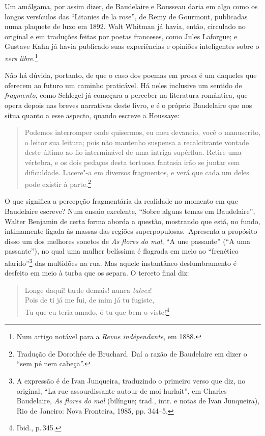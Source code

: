 Um amálgama, por assim dizer, de Baudelaire e Rousseau daria em algo
como os longos versículos das ``Litanies de la rose'', de Remy de
Gourmont, publicadas numa plaquete de luxo em 1892.
Walt Whitman já havia, então, circulado no original e em traduções
feitas por poetas franceses, como Jules Laforgue; e Gustave Kahn já
havia publicado suas experiências e opiniões inteligentes sobre o
\textit{vers libre}.\footnote{ Num artigo notável para a \textit{Revue
indépendante}, em 1888.}

Não há dúvida, portanto, de que o caso dos poemas em prosa é um
daqueles que oferecem ao futuro um caminho praticável. Há
neles inclusive um sentido de \textit{fragmento}, como Schlegel já
começara a perceber na literatura romântica, que opera depois nas
breves narrativas deste livro, e é o próprio Baudelaire que nos situa
quanto a esse aspecto, quando escreve a Houssaye: 

\begin{quote}
Podemos interromper
onde quisermos, eu meu devaneio, você o manuscrito, o leitor sua
leitura; pois não mantenho suspensa a recalcitrante vontade deste
último ao fio interminável de uma intriga supérflua. Retire uma
vértebra, e os dois pedaços desta tortuosa fantasia irão se juntar sem
dificuldade. Lacere"-a em diversos fragmentos, e verá que cada um
deles pode existir à parte.\footnote{ Tradução de Dorothée de Bruchard.
Daí a razão de Baudelaire em dizer o “sem pé nem cabeça”.}
\end{quote}

O que significa a percepção fragmentária da realidade no momento em que
Baudelaire escreve? Num ensaio excelente, “Sobre alguns temas em
Baudelaire”, Walter Benjamin de certa forma aborda a questão, mostrando
que está, no fundo, intimamente ligada às massas das regiões
superpopulosas.~Apresenta a propósito disso um dos melhores sonetos de
\textit{As flores do mal}, “A une passante” (“A uma passante”), no qual uma
 mulher belíssima é flagrada em meio ao “frenético alarido”\footnote{ A
expressão é de Ivan Junqueira, traduzindo o primeiro verso que diz, no
original, “La rue assourdissante autour de moi hurlait”, em
Charles Baudelaire, \textit{As flores do mal} (bilíngue; trad.,
intr. e notas de Ivan Junqueira), Rio de Janeiro: Nova Fronteira,
1985, pp. 344--5.} das multidões na rua. Mas aquele instantâneo
deslumbramento é desfeito em meio à turba que os separa. O terceto
final diz:


\begin{quote}
Longe daqui! tarde demais! nunca \textit{talvez}!\\ 
Pois de ti já me fui, de mim já tu fugiste,\\
Tu que eu teria amado, ó tu que bem o viste!\footnote{Ibid., p.\,345.}
\end{quote}

